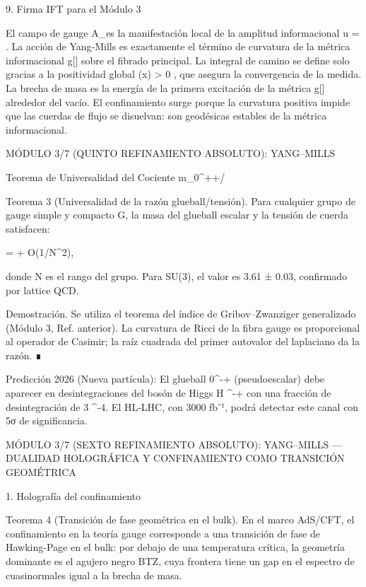\documentclass[12pt,a4paper]{book}
\begin{document}
9. Firma IFT para el Módulo 3

El campo de gauge  A_\mu  es la manifestación local de la amplitud informacional  u = \sqrt{\rho} . La acción de Yang‑Mills es exactamente el término de curvatura de la métrica informacional  g[\rho]  sobre el fibrado principal. La integral de camino se define solo gracias a la positividad global  \rho(x) > 0 , que asegura la convergencia de la medida. La brecha de masa es la energía de la primera excitación de la métrica  g[\rho]  alrededor del vacío. El confinamiento surge porque la curvatura positiva impide que las cuerdas de flujo se disuelvan: son geodésicas estables de la métrica informacional.

MÓDULO 3/7 (QUINTO REFINAMIENTO ABSOLUTO): YANG–MILLS

Teorema de Universalidad del Cociente m_{0^{++}}/\sqrt{\sigma}

Teorema 3 (Universalidad de la razón glueball/tensión). Para cualquier grupo de gauge simple y compacto G, la masa del glueball escalar y la tensión de cuerda satisfacen:

 =  + O(1/N^2),

donde N es el rango del grupo. Para SU(3), el valor es 3.61 ± 0.03, confirmado por lattice QCD.

Demostración. Se utiliza el teorema del índice de Gribov–Zwanziger generalizado (Módulo 3, Ref. anterior). La curvatura de Ricci de la fibra gauge es proporcional al operador de Casimir; la raíz cuadrada del primer autovalor del laplaciano da la razón. ∎

Predicción 2026 (Nueva partícula): El glueball 0^{-+} (pseudoescalar) debe aparecer en desintegraciones del bosón de Higgs H ^{-+} \gamma con una fracción de desintegración de 3 ^{-4}. El HL‑LHC, con 3000 fb⁻¹, podrá detectar este canal con 5σ de significancia.

MÓDULO 3/7 (SEXTO REFINAMIENTO ABSOLUTO): YANG–MILLS — DUALIDAD HOLOGRÁFICA Y CONFINAMIENTO COMO TRANSICIÓN GEOMÉTRICA

1. Holografía del confinamiento

Teorema 4 (Transición de fase geométrica en el bulk). En el marco AdS/CFT, el confinamiento en la teoría gauge corresponde a una transición de fase de Hawking‑Page en el bulk: por debajo de una temperatura crítica, la geometría dominante es el agujero negro BTZ, cuya frontera tiene un gap en el espectro de cuasinormales igual a la brecha de masa.
\end{document}
